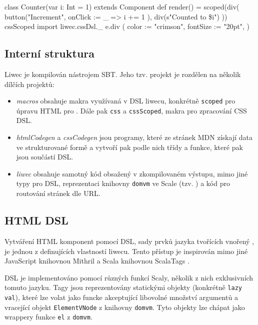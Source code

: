\begin{code}
class Counter(var i: Int = 1) extends Component {
    def render() = scoped(div(
            button("Increment",
                   onClick := { _ => i += 1 }),
            div(s"Counted to \$i")
    ))
    cssScoped { import liwec.cssDsl._
        e.div (
            color := "crimson",
            fontSize := "20pt",
        )
    }
}
\end{code}

\subsection{Interní struktura}

Liwec je kompilován nástrojem SBT. Jeho tzv. projekt je rozdělen na několik dílčích projektů:

\begin{itemize}
	\item \emph{macros} obsahuje makra využívaná v DSL liwecu, konkrétně
	\texttt{scoped} pro úpravu HTML pro . Dále pak
	\texttt{css} a \texttt{cssScoped}, makra pro zpracování CSS DSL.

	\item \emph{htmlCodegen} a \emph{cssCodegen} jsou programy, které ze
	stránek MDN získají data ve strukturované formě a vytvoří pak podle
	nich třídy a funkce, které pak jsou součástí DSL.

	\item \emph{liwec} obsahuje samotný kód obsažený v zkompilovaném výstupu,
	mimo jiné typy pro DSL, reprezentaci knihovny \texttt{domvm} ve Scale
	(tzv. ) a kód pro routování stránek dle URL.
\end{itemize}

\subsection{HTML DSL}

Vytváření HTML komponent pomocí DSL, sady prvků jazyka tvořících vnořený
, je jednou z definujících vlastností liwecu. Tento přístup je
inspirován mimo jiné JavaScript knihovnou Mithril \citep[viz][]{MithrilJs} a
Scala knihovnou ScalaTags \citep[viz][]{ScalaTags}.

DSL je implementováno pomocí různých funkcí Scaly, několik z nich exklusivních
tomuto jazyku. Tagy jsou reprezentovány statickými objekty (konkrétně
\texttt{lazy val}), které lze volat jako funcke akceptující libovolné množství
argumentů a vracející objekt \texttt{Element\-VNode} z knihovny \texttt{domvm}.
Tyto objekty lze chápat jako  wrappery funkce \texttt{el} z
\texttt{domvm}.

